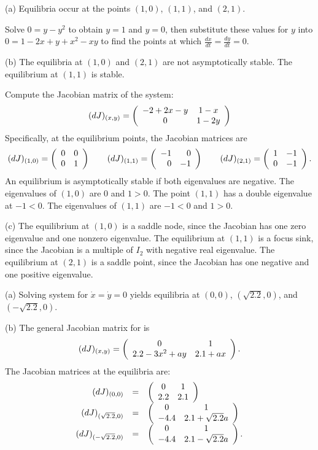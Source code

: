 \begin{figure}[htb]
                       \centerline{%
                       }
\end{figure}

\newpage
{}
(a) \ans Equilibria occur at the points $(1,0)$, $(1,1)$, and $(2,1)$.

\soln Solve $0 = y - y^2$ to obtain $y = 1$ and $y = 0$, then substitute
these values for $y$ into $0 = 1 - 2x + y + x^2 - xy$ to find the points
at which $\frac{dx}{dt} = \frac{dy}{dt} = 0$.

(b) \ans The equilibria at $(1,0)$ and $(2,1)$ are not asymptotically
stable.  The equilibrium at $(1,1)$ is stable.

\soln Compute the Jacobian matrix of the system:
\[
(dJ)_{(x,y)} = \left(\begin{array}{cc} -2 + 2x - y & 1 - x\\ 0 &1 - 2y\end{array}\right)
\]
Specifically, at the equilibrium points, the Jacobian matrices are
\[
(dJ)_{(1,0)} = \left(\begin{array}{rr} 0 & 0\\ 0 &1\end{array}\right) \qquad (dJ)_{(1,1)} =
\left(\begin{array}{rr} -1 & 0\\ 0 &-1\end{array}\right) \qquad (dJ)_{(2,1)} = \left(\begin{array}{rr} 1 & -1\\ 0 &-1\end{array}\right).
\]
An equilibrium is asymptotically stable if both eigenvalues are
negative.  The eigenvalues of $(1,0)$ are $0$ and $1 > 0$.
The point $(1,1)$ has a double eigenvalue at $-1 < 0$.
The eigenvalues of $(1,1)$ are $-1 < 0$ and $1 > 0$.

(c) The equilibrium at $(1,0)$ is a saddle node, since the Jacobian
has one zero eigenvalue and one nonzero eigenvalue.  The equilibrium
at $(1,1)$ is a focus sink, since the Jacobian is a multiple of $I_2$
with negative real eigenvalue.  The equilibrium at $(2,1)$ is a
saddle point, since the Jacobian has one negative and one positive
eigenvalue.

(a) Solving system  for $\dot{x} = \dot{y} = 0$
yields equilibria at $(0,0)$, $(\sqrt{2.2},0)$, and $(-\sqrt{2.2},0)$.

(b) The general Jacobian matrix for  is
\[
(dJ)_{(x,y)} = \left(\begin{array}{cc} 0 & 1\\ 2.2 - 3x^2 + ay &2.1 + ax\end{array}\right).
\]
The Jacobian matrices at the equilibria are:
\[ \begin{array}{rcl}
(dJ)_{(0,0)} & = & \left(\begin{array}{cc} 0 & 1\\ 2.2 &2.1\end{array}\right) \\
(dJ)_{(\sqrt{2.2},0)} & = & \left(\begin{array}{cc} 0 & 1\\ -4.4 &2.1 + \sqrt{2.2}a\end{array}\right) \\
(dJ)_{(-\sqrt{2.2},0)} & = & \left(\begin{array}{cc} 0 & 1\\ -4.4 &2.1 - \sqrt{2.2}a\end{array}\right). \\
\end{array}
\]

